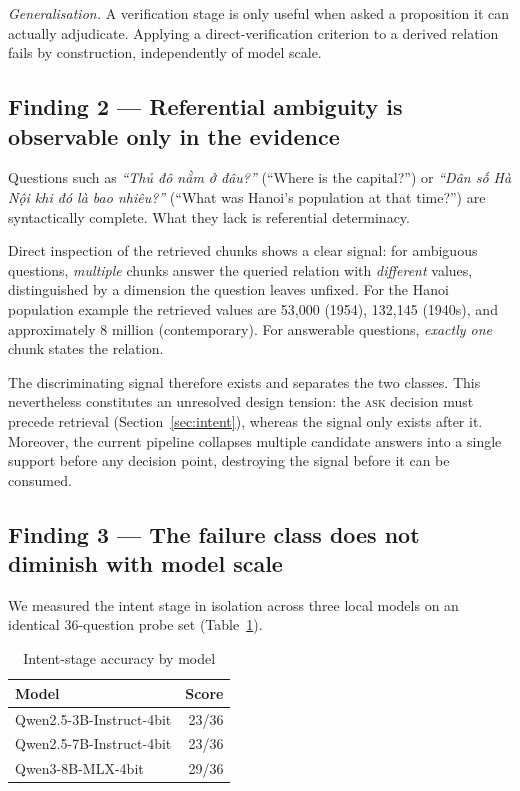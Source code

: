 \documentclass[conference]{IEEEtran}
\newcommand{\ACT}[1]{\textsc{#1}}
\begin{document}
\emph{Generalisation.} A verification stage is only useful when asked a
proposition it can actually adjudicate. Applying a direct-verification criterion
to a derived relation fails by construction, independently of model scale.

\subsection{Finding 2 --- Referential ambiguity is observable only in the evidence}

Questions such as \emph{``Thủ đô nằm ở đâu?''} (``Where is the capital?'') or
\emph{``Dân số Hà Nội khi đó là bao nhiêu?''} (``What was Hanoi's population at
that time?'') are syntactically complete. What they lack is referential
determinacy.

Direct inspection of the retrieved chunks shows a clear signal: for ambiguous
questions, \emph{multiple} chunks answer the queried relation with \emph{different}
values, distinguished by a dimension the question leaves unfixed. For the Hanoi
population example the retrieved values are 53{,}000 (1954), 132{,}145 (1940s),
and approximately 8 million (contemporary). For answerable questions,
\emph{exactly one} chunk states the relation.

The discriminating signal therefore exists and separates the two classes. This
nevertheless constitutes an unresolved design tension: the \ACT{ask} decision must
precede retrieval (Section~\ref{sec:intent}), whereas the signal only exists after
it. Moreover, the current pipeline collapses multiple candidate answers into a
single support before any decision point, destroying the signal before it can be
consumed.

\subsection{Finding 3 --- The failure class does not diminish with model scale}
\label{sec:scaling}

We measured the intent stage in isolation across three local models on an
identical 36-question probe set (Table~\ref{tab:scaling}).

\begin{table}[t]
\caption{Intent-stage accuracy by model}
\label{tab:scaling}
\centering
\footnotesize
\begin{tabular}{@{}lr@{}}
\toprule
Model & Score \\
\midrule
Qwen2.5-3B-Instruct-4bit & 23/36 \\
Qwen2.5-7B-Instruct-4bit & 23/36 \\
Qwen3-8B-MLX-4bit        & 29/36 \\
\bottomrule
\end{tabular}
\end{table}
\end{document}
